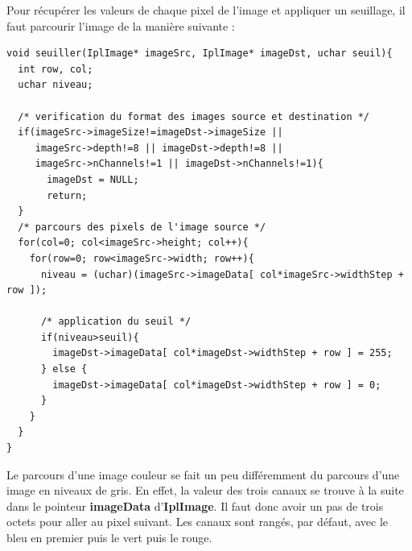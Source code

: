 Pour récupérer les valeurs de chaque pixel de l'image et appliquer un seuillage, il faut parcourir l'image de la manière suivante :






\begin{lstlisting}[caption=Fonction seuiller avec OpenCV]
void seuiller(IplImage* imageSrc, IplImage* imageDst, uchar seuil){
  int row, col;
  uchar niveau;

  /* verification du format des images source et destination */
  if(imageSrc->imageSize!=imageDst->imageSize ||
     imageSrc->depth!=8 || imageDst->depth!=8 ||
     imageSrc->nChannels!=1 || imageDst->nChannels!=1){
       imageDst = NULL;
       return;
  }
  /* parcours des pixels de l'image source */
  for(col=0; col<imageSrc->height; col++){
    for(row=0; row<imageSrc->width; row++){
      niveau = (uchar)(imageSrc->imageData[ col*imageSrc->widthStep + row ]);

      /* application du seuil */
      if(niveau>seuil){
        imageDst->imageData[ col*imageDst->widthStep + row ] = 255;
      } else {
        imageDst->imageData[ col*imageDst->widthStep + row ] = 0;
      }
    }
  }
}
\end{lstlisting}
Le parcours d'une image couleur se fait un peu différemment du parcours d'une image en niveaux de gris.
En effet, la valeur des trois canaux se trouve à la suite dans le pointeur \textbf{imageData} d'\textbf{IplImage}.
Il faut donc avoir un pas de trois octets pour aller au pixel suivant. Les canaux sont rangés, par défaut, avec 
le bleu en premier puis le vert puis le rouge.\\

